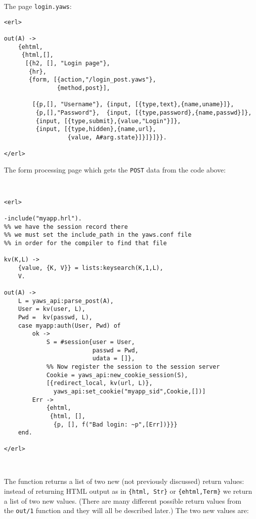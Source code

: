 \documentclass[11pt,oneside,english]{book}
\begin{document}
The page \verb+login.yaws+:

\begin{verbatim}
<erl>

out(A) ->
    {ehtml,
     {html,[],
      [{h2, [], "Login page"},
       {hr},
       {form, [{action,"/login_post.yaws"},
               {method,post}],

        [{p,[], "Username"}, {input, [{type,text},{name,uname}]},
         {p,[],"Password"},  {input, [{type,password},{name,passwd}]},
         {input, [{type,submit},{value,"Login"}]},
         {input, [{type,hidden},{name,url},
                  {value, A#arg.state}]}]}]}}.

</erl>
\end{verbatim}



The form processing page which gets the \verb+POST+ data from the code
above:

\begin{verbatim}


<erl>

-include("myapp.hrl").
%% we have the session record there
%% we must set the include_path in the yaws.conf file
%% in order for the compiler to find that file

kv(K,L) ->
    {value, {K, V}} = lists:keysearch(K,1,L),
    V.

out(A) ->
    L = yaws_api:parse_post(A),
    User = kv(user, L),
    Pwd =  kv(passwd, L),
    case myapp:auth(User, Pwd) of
        ok ->
            S = #session{user = User,
                         passwd = Pwd,
                         udata = []},
            %% Now register the session to the session server
            Cookie = yaws_api:new_cookie_session(S),
            [{redirect_local, kv(url, L)},
              yaws_api:set_cookie("myapp_sid",Cookie,[])]
        Err ->
            {ehtml,
             {html, [],
              {p, [], f("Bad login: ~p",[Err])}}}
    end.

</erl>



\end{verbatim}

The function returns a list of two new (not previously discussed)
return values: instead of returning HTML output as in
\verb+{html, Str}+ or \verb+{ehtml,Term}+ we return a list of two new
values. (There are many different possible return values from the
\verb+out/1+ function and they will all be described later.) The two
new values are:
\end{document}
